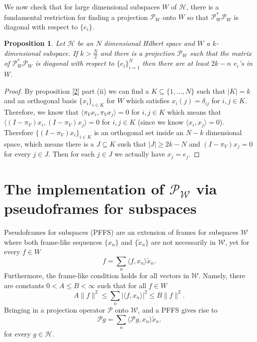 \documentclass[11pt,reqno]{amsart}
\newtheorem{proposition}[thm]{Proposition}
\theoremstyle{remark}
\begin{document}
We now check that for large dimensional subspaces $W$ of $\mathcal{H}$, there is a fundamental restriction for finding a projection $\mathcal{P}_W$ onto $W$ so that $\mathcal{P}_W^*\mathcal{P}_W$ is diagonal with respect to $\{e_i\}$.

\begin{proposition}
Let $\mathcal{H}$ be an $N$ dimensional Hilbert space and $W$ a $k$-dimensional subspace.  If $k>\frac{N}{2}$ and there is a projection $\mathcal{P}_W$ such that the matrix of $\mathcal{P}_W^*\mathcal{P}_W$ is diagonal with respect to $\{e_i\}_{i=1}^N$ then there are at least $2k-n$ $e_i$'s in $W$.
\end{proposition}
\begin{proof}
By proposition \ref{2} part (ii) we can find a $K\subseteq\{1,...,N\}$ such that $|K|=k$ and an orthogonal basis $\{x_i\}_{i\in K}$ for $W$ which satisfies $x_i(j)=\delta_{ij}$ for $i,j\in K$.  Therefore, we know that $\langle\pi_Vx_i,\pi_Vx_j\rangle=0$ for $i,j\in K$ which means that $\langle(I-\pi_V)x_i,(I-\pi_V)x_j\rangle=0$ for $i,j\in K$ (since we know $\langle x_i,x_j\rangle=0$).  Therefore $\{(I-\pi_V)x_i\}_{i\in K}$ is an orthogonal set inside an $N-k$ dimensional space, which means there is a $J\subseteq K$ such that $|J|\geq 2k-N$ and $(I-\pi_V)x_j=0$ for every $j\in J$.  Then for each $j\in J$ we actually have $x_j=e_j$.
\end{proof}

\section{The implementation of ${{\mathcal P}_{{\mathcal W}}}$ via pseudoframes for subspaces}\label{secPFFS}

Pseudoframes for subspaces (PFFS) \cite{LiOgPFFS98} are an extension of frames for subspaces ${{\mathcal W}}$ where both frame-like sequences $\{x_n\}$ and $\{\tilde x_n\}$ are not necessarily in ${{\mathcal W}}$, yet for every $f\in W$
\[
f=\sum_n{\langle} f, x_n{\rangle} \tilde x_n.
\]
Furthermore, the frame-like condition holds for all vectors in ${{\mathcal W}}$.  Namely, there are constants $0<A\leq B<\infty$ such that for all $f\in W$
\[
A\|f\|^2 \leq\sum_n |{\langle} f, x_n{\rangle} |^2 \leq B\|f\|^2.
\]
Bringing in a projection operator ${{\mathcal P}}$ onto ${{\mathcal W}}$, and a PFFS gives rise to
\begin{equation}\label{pffs}
{{\mathcal P}} g=\sum_n{\langle}{{\mathcal P}} g, x_n{\rangle} \tilde x_n.
\end{equation}
for every $g\in\mathcal{H}$.
\end{document}
